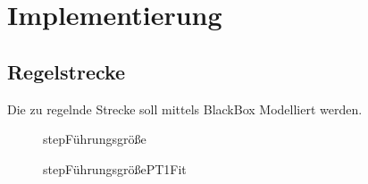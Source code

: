 
\chapter{Implementierung}

\section{Regelstrecke}
Die zu regelnde Strecke soll mittels BlackBox Modelliert werden.
\begin{figure}[H]
\caption{stepFührungsgröße}
\label{Grundlagen:stepFührungsgröße}
\end{figure}

\begin{figure}[H]
\caption{stepFührungsgrößePT1Fit}
\label{Grundlagen:stepFührungsgrößePT1Fit}
\end{figure}



